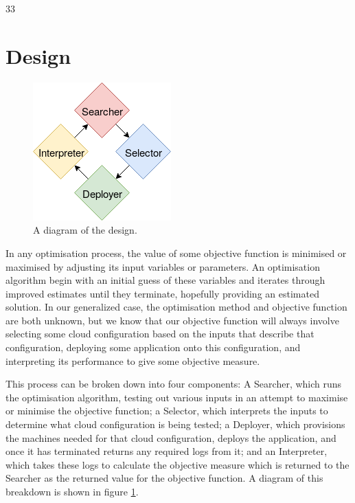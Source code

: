 33\documentclass{article}
\begin{document}
\section{Design}
\begin{figure}[!ht]
  \centering
   \includegraphics[scale=0.8]{Design}
  \caption{A diagram of the design.}
  \label{fig:design}
\end{figure}

In any optimisation process, the value of some objective function is minimised or maximised by adjusting its input variables or parameters. An optimisation algorithm begin with an initial guess of these variables and iterates through improved estimates until they terminate, hopefully providing an estimated solution. \cite{Nocedal2006} In our generalized case, the optimisation method and objective function are both unknown, but we know that our objective function will always involve selecting some cloud configuration based on the inputs that describe that configuration, deploying some application onto this configuration, and interpreting its performance to give some objective measure.

This process can be broken down into four components: A Searcher, which runs the optimisation algorithm, testing out various inputs in an attempt to maximise or minimise the objective function; a Selector, which interprets the inputs to determine what cloud configuration is being tested; a Deployer, which provisions the machines needed for that cloud configuration, deploys the application, and once it has terminated returns any required logs from it; and an Interpreter, which takes these logs to calculate the objective measure which is returned to the Searcher as the returned value for the objective function. A diagram of this breakdown is shown in figure \ref{fig:design}.
\end{document}
